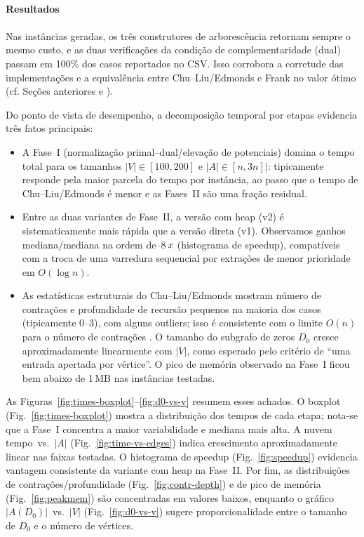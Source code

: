 \documentclass[12pt,a4paper]{article}
\def\emph#1{#1}%
\def\times{\string x}%
\begin{document}
\paragraph{Resultados}
\paragraph{}
Nas instâncias geradas, os três construtores de arborescência retornam sempre o mesmo custo, e as duas verificações da condição de complementaridade (dual) passam em 100\% dos casos reportados no CSV. Isso corrobora a corretude das implementações e a equivalência entre \emph{Chu--Liu/Edmonds} e \emph{Frank} no valor ótimo (cf. Seções anteriores e \cite{frank2014,schrijver2003comb}).

Do ponto de vista de desempenho, a decomposição temporal por etapas evidencia três fatos principais:
\begin{itemize}\setlength{\itemsep}{2pt}
    \item A Fase~I (normalização primal--dual/elevação de potenciais) domina o tempo total para os tamanhos \(|V|\in[100,200]\) e \(|A|\in[n,3n]|\): tipicamente responde pela maior parcela do tempo por instância, ao passo que o tempo de \emph{Chu--Liu/Edmonds} é menor e as Fases~II são uma fração residual.
    \item Entre as duas variantes de Fase~II, a versão com heap (v2) é sistematicamente mais rápida que a versão direta (v1). Observamos ganhos mediana/mediana na ordem de--8\,$\times$ (histograma de speedup), compatíveis com a troca de uma varredura sequencial por extrações de menor prioridade em \(O(\log n)\).
    \item As estatísticas estruturais do \emph{Chu--Liu/Edmonds} mostram número de contrações e profundidade de recursão pequenos na maioria dos casos (tipicamente 0--3), com alguns outliers; isso é consistente com o limite \(O(n)\) para o número de contrações \cite{schrijver2003comb}. O tamanho do subgrafo de zeros \(D_0\) cresce aproximadamente linearmente com \(|V|\), como esperado pelo critério de “uma entrada apertada por vértice”. O pico de memória observado na Fase~I ficou bem abaixo de 1\,MB nas instâncias testadas.
\end{itemize}

As Figuras~\ref{fig:times-boxplot}--\ref{fig:d0-vs-v} resumem esses achados. O boxplot (Fig.~\ref{fig:times-boxplot}) mostra a distribuição dos tempos de cada etapa; nota-se que a Fase~I concentra a maior variabilidade e mediana mais alta. A nuvem tempo~vs.~\(|A|\) (Fig.~\ref{fig:time-vs-edges}) indica crescimento aproximadamente linear nas faixas testadas. O histograma de speedup (Fig.~\ref{fig:speedup}) evidencia vantagem consistente da variante com heap na Fase~II. Por fim, as distribuições de contrações/profundidade (Fig.~\ref{fig:contr-depth}) e de pico de memória (Fig.~\ref{fig:peakmem}) são concentradas em valores baixos, enquanto o gráfico \(|A(D_0)|\)~vs.~\(|V|\) (Fig.~\ref{fig:d0-vs-v}) sugere proporcionalidade entre o tamanho de \(D_0\) e o número de vértices.
\end{document}
